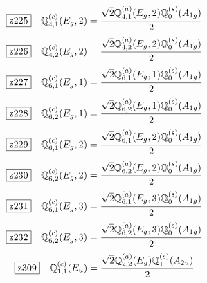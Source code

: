 \documentclass[fleqn,10pt,landscape]{jsarticle}
\begin{document}
\begin{dmath*}
\hspace*{3mm}\fbox{z225}\quad \mathbb{Q}_{4,1}^{(c)}(E_{g},2)=\frac{\sqrt{2} \mathbb{Q}_{4,1}^{(a)}(E_{g},2) \mathbb{Q}_{0}^{(s)}(A_{1g})}{2}
\end{dmath*}
\begin{dmath*}
\hspace*{3mm}\fbox{z226}\quad \mathbb{Q}_{4,2}^{(c)}(E_{g},2)=\frac{\sqrt{2} \mathbb{Q}_{4,2}^{(a)}(E_{g},2) \mathbb{Q}_{0}^{(s)}(A_{1g})}{2}
\end{dmath*}
\begin{dmath*}
\hspace*{3mm}\fbox{z227}\quad \mathbb{Q}_{6,1}^{(c)}(E_{g},1)=\frac{\sqrt{2} \mathbb{Q}_{6,1}^{(a)}(E_{g},1) \mathbb{Q}_{0}^{(s)}(A_{1g})}{2}
\end{dmath*}
\begin{dmath*}
\hspace*{3mm}\fbox{z228}\quad \mathbb{Q}_{6,2}^{(c)}(E_{g},1)=\frac{\sqrt{2} \mathbb{Q}_{6,2}^{(a)}(E_{g},1) \mathbb{Q}_{0}^{(s)}(A_{1g})}{2}
\end{dmath*}
\begin{dmath*}
\hspace*{3mm}\fbox{z229}\quad \mathbb{Q}_{6,1}^{(c)}(E_{g},2)=\frac{\sqrt{2} \mathbb{Q}_{6,1}^{(a)}(E_{g},2) \mathbb{Q}_{0}^{(s)}(A_{1g})}{2}
\end{dmath*}
\begin{dmath*}
\hspace*{3mm}\fbox{z230}\quad \mathbb{Q}_{6,2}^{(c)}(E_{g},2)=\frac{\sqrt{2} \mathbb{Q}_{6,2}^{(a)}(E_{g},2) \mathbb{Q}_{0}^{(s)}(A_{1g})}{2}
\end{dmath*}
\begin{dmath*}
\hspace*{3mm}\fbox{z231}\quad \mathbb{Q}_{6,1}^{(c)}(E_{g},3)=\frac{\sqrt{2} \mathbb{Q}_{6,1}^{(a)}(E_{g},3) \mathbb{Q}_{0}^{(s)}(A_{1g})}{2}
\end{dmath*}
\begin{dmath*}
\hspace*{3mm}\fbox{z232}\quad \mathbb{Q}_{6,2}^{(c)}(E_{g},3)=\frac{\sqrt{2} \mathbb{Q}_{6,2}^{(a)}(E_{g},3) \mathbb{Q}_{0}^{(s)}(A_{1g})}{2}
\end{dmath*}
\begin{dmath*}
\hspace*{3mm}\fbox{z309}\quad \mathbb{Q}_{1,1}^{(c)}(E_{u})=\frac{\sqrt{2} \mathbb{Q}_{2,2}^{(a)}(E_{g}) \mathbb{Q}_{1}^{(s)}(A_{2u})}{2}
\end{dmath*}
\end{document}
